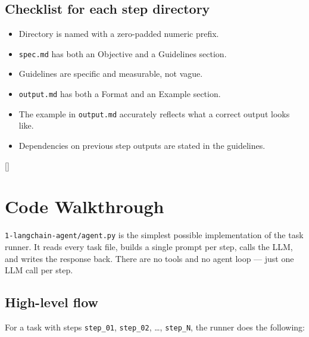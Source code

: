 \documentclass[12pt, a4paper]{article}
\begin{document}
\subsection{Checklist for each step directory}

\begin{itemize}[leftmargin=1.5em]
  \item Directory is named with a zero-padded numeric prefix.
  \item \texttt{spec.md} has both an Objective and a Guidelines section.
  \item Guidelines are specific and measurable, not vague.
  \item \texttt{output.md} has both a Format and an Example section.
  \item The example in \texttt{output.md} accurately reflects what a correct output looks like.
  \item Dependencies on previous step outputs are stated in the guidelines.
\end{itemize}

\appendix
\renewcommand{\thesection}{\Alph{section}}
\titleformat{\section}{\Large\bfseries\color{darktext}}{Annex \thesection\ ---\ }{0em}{}[\color{primary}\titlerule]

\clearpage
\section{Code Walkthrough}

\texttt{1-langchain-agent/agent.py} is the simplest possible implementation of the task runner. It reads every task file, builds a single prompt per step, calls the LLM, and writes the response back. There are no tools and no agent loop --- just one LLM call per step.

\subsection{High-level flow}

For a task with steps \texttt{step\_01}, \texttt{step\_02}, \ldots, \texttt{step\_N}, the runner does the following:
\end{document}
